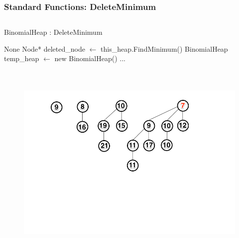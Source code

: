 \documentclass[13pt]{beamer}
\begin{document}
\begin{frame}
\frametitle{Standard Functions: DeleteMinimum}

  \begin{columns}[T] %
    \begin{column}[T]{8cm} %
        \begin{algorithm}[H]
        \small
        \caption{BinomialHeap : DeleteMinimum}
        \begin{algorithmic}
          \REQUIRE None
          \STATE Node* deleted\_node $\leftarrow$ this\_heap.FindMinimum()
          \STATE BinomialHeap temp\_heap $\leftarrow$ new BinomialHeap() ...
        \end{algorithmic}
        \end{algorithm}
    \end{column}
  \end{columns}

  \begin{figure}
    \includegraphics[height=9cm]{./img/deleteminA.png}
  \end{figure}
\end{frame}
\end{document}
